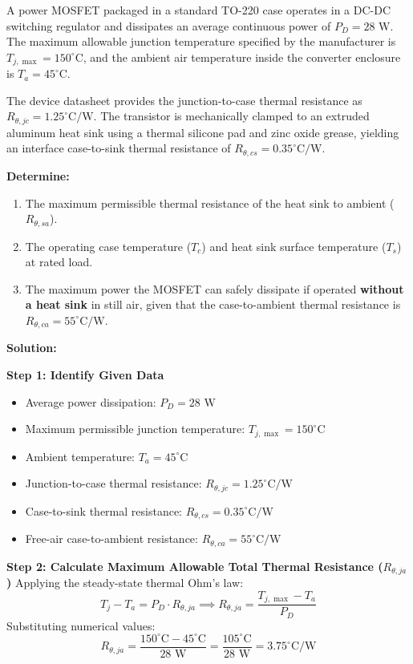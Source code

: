\documentclass[11pt,a4paper]{article}
\begin{document}
\begin{examplebox}
A power MOSFET packaged in a standard TO-220 case operates in a DC-DC switching regulator and dissipates an average continuous power of $P_D = 28\text{ W}$. The maximum allowable junction temperature specified by the manufacturer is $T_{j,\max} = 150^\circ\text{C}$, and the ambient air temperature inside the converter enclosure is $T_a = 45^\circ\text{C}$.

The device datasheet provides the junction-to-case thermal resistance as $R_{\theta,jc} = 1.25^\circ\text{C/W}$. The transistor is mechanically clamped to an extruded aluminum heat sink using a thermal silicone pad and zinc oxide grease, yielding an interface case-to-sink thermal resistance of $R_{\theta,cs} = 0.35^\circ\text{C/W}$.

\textbf{Determine:}
\begin{enumerate}[label=(\alph*)]
  \item The maximum permissible thermal resistance of the heat sink to ambient ($R_{\theta,sa}$).
  \item The operating case temperature ($T_c$) and heat sink surface temperature ($T_s$) at rated load.
  \item The maximum power the MOSFET can safely dissipate if operated \textbf{without a heat sink} in still air, given that the case-to-ambient thermal resistance is $R_{\theta,ca} = 55^\circ\text{C/W}$.
\end{enumerate}

\tcblower
\textbf{Solution:}

\textbf{Step 1: Identify Given Data}
\begin{itemize}[leftmargin=*]
  \item Average power dissipation: $P_D = 28\text{ W}$
  \item Maximum permissible junction temperature: $T_{j,\max} = 150^\circ\text{C}$
  \item Ambient temperature: $T_a = 45^\circ\text{C}$
  \item Junction-to-case thermal resistance: $R_{\theta,jc} = 1.25^\circ\text{C/W}$
  \item Case-to-sink thermal resistance: $R_{\theta,cs} = 0.35^\circ\text{C/W}$
  \item Free-air case-to-ambient resistance: $R_{\theta,ca} = 55^\circ\text{C/W}$
\end{itemize}

\textbf{Step 2: Calculate Maximum Allowable Total Thermal Resistance ($R_{\theta,ja}$)}
Applying the steady-state thermal Ohm's law:
\begin{equation}
T_j - T_a = P_D \cdot R_{\theta,ja} \implies R_{\theta,ja} = \frac{T_{j,\max} - T_a}{P_D}
\end{equation}
Substituting numerical values:
\begin{equation}
R_{\theta,ja} = \frac{150^\circ\text{C} - 45^\circ\text{C}}{28\text{ W}} = \frac{105^\circ\text{C}}{28\text{ W}} = 3.75^\circ\text{C/W}
\end{equation}


\end{examplebox}
\end{document}
